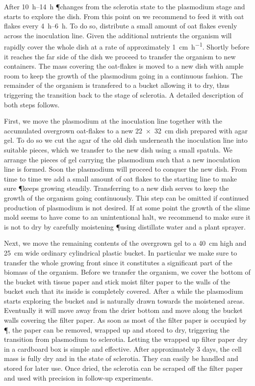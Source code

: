 		After \SIrange{10}{14}{\hour} \P changes from the sclerotia state to the plasmodium stage and starts to explore the dish. From this point on we recommend to feed it with oat flakes every \SIrange{4}{6}{\hour}. To do so, distribute a small amount of oat flakes evenly across the inoculation line. Given the additional nutrients the organism will rapidly cover the whole dish at a rate of approximately \SI{1}{\centi\metre\per\hour}. Shortly before it reaches the far side of the dish we proceed to transfer the organism to new containers. The mass covering the oat-flakes is moved to a new dish with ample room to keep the growth of the plasmodium going in a continuous fashion. The remainder of the organism is transfered to a bucket allowing it to dry, thus triggering the transition back to the stage of sclerotia. A detailed description of both steps follows.

		First, we move the plasmodium at the inoculation line together with the accumulated overgrown oat-flakes to a new \SI{22 x 32}{\centi\metre} dish prepared with agar gel. To do so we cut the agar of the old dish underneath the inoculation line into suitable pieces, which we transfer to the new dish using a small spatula. We arrange the pieces of gel carrying the plasmodium such that a new inoculation line is formed. Soon the plasmodium will proceed to conquer the new dish. From time to time we add a small amount of oat flakes to the starting line to make sure \P keeps growing steadily. Transferring to a new dish serves to keep the growth of the organism going continuously. This step can be omitted if continued production of plasmodium is not desired. If at some point the growth of the slime mold seems to have come to an unintentional halt, we recommend to make sure it is not to dry by carefully moistening \P using distillate water and a plant sprayer.

		Next, we move the remaining contents of the overgrown gel to a \SI{40}{\centi\metre} high and \SI{25}{\centi\metre} wide ordinary cylindrical plastic bucket. In particular we make sure to transfer the whole growing front since it constitutes a significant part of the biomass of the organism. Before we transfer the organism, we cover the bottom of the bucket with tissue paper and stick moist filter paper to the walls of the bucket such that its inside is completely covered. After a while the plasmodium starts exploring the bucket and is naturally drawn towards the moistened areas. Eventually it will move away from the drier bottom and move along the bucket walls covering the filter paper. As soon as most of the filter paper is occupied by \P, the paper can be removed, wrapped up and stored to dry, triggering the transition from plasmodium to sclerotia. Letting the wrapped up filter paper dry in a cardboard box is simple and effective. After approximately $3$ days, the cell mass is fully dry and in the state of sclerotia. They can easily be handled and stored for later use. Once dried, the sclerotia can be scraped off the filter paper and used with precision in follow-up experiments.
